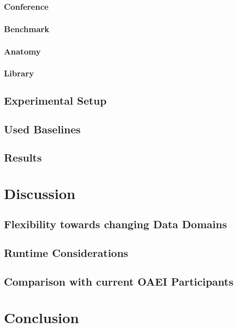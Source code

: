 \documentclass[11pt,titlepage,oneside,openany,a4paper]{report}
\begin{document}
\subsection{Conference}
\subsection{Benchmark}
\subsection{Anatomy}
\subsection{Library}
\section{Experimental Setup}
\section{Used Baselines}
\section{Results}



\chapter{Discussion}
\section{Flexibility towards changing Data Domains}
\section{Runtime Considerations}
\section{Comparison with current OAEI Participants}


\chapter{Conclusion}


\clearpage
\newpage
\end{document}
